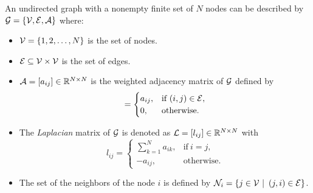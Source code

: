 An undirected graph with a nonempty finite set of $N$ nodes can be described by $\mathcal{G} =\{\mathcal{V},\mathcal{E},\mathcal{A}\}$ where:
\begin{itemize}
    \item $\mathcal{V} = \{1, 2, \dots, N\}$ is the set of nodes.
    \item $\mathcal{E} \subseteq \mathcal{V} \times \mathcal{V}$ is the set of edges.
    \item $\mathcal{A} = [a_{ij}] \in \mathbb{R}^{N \times N}$ is the weighted adjacency matrix of $\mathcal{G}$ defined by
    \begin{equation}
        [a_{ij}] = \begin{cases}
            a_{ij}, & \text{if}\ (i,j) \in \E , \\
            0, & \text{otherwise}.
        \end{cases}
    \end{equation}
    \item The {\it Laplacian} matrix of $\mathcal{G}$ is denoted as $\mathcal{L} = [l_{ij}] \in \mathbb{R}^{N \times N}$ with
    \begin{equation}
        l_{ij} = \begin{cases}
            \sum_{k=1}^{N}a_{ik}, & \text{if}\  i = j , \\
            -a_{ij}, & \text{otherwise}.
        \end{cases}
    \end{equation}
    \item The set of the neighbors of the node $i$ is defined by $\N_{i} =  \left\{j \in \V \ | \ \left( j, i \right) \in \E \right\}$.
\end{itemize}

